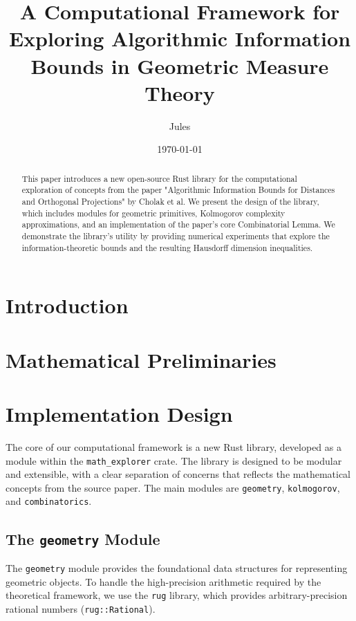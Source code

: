 \documentclass{article}
\title{A Computational Framework for Exploring Algorithmic Information Bounds in Geometric Measure Theory}
\author{Jules}
\date{\today}
\begin{document}
\maketitle

\begin{abstract}
This paper introduces a new open-source Rust library for the computational exploration of concepts from the paper "Algorithmic Information Bounds for Distances and Orthogonal Projections" by Cholak et al. We present the design of the library, which includes modules for geometric primitives, Kolmogorov complexity approximations, and an implementation of the paper's core Combinatorial Lemma. We demonstrate the library's utility by providing numerical experiments that explore the information-theoretic bounds and the resulting Hausdorff dimension inequalities.
\end{abstract}

\section{Introduction}

\section{Mathematical Preliminaries}

\section{Implementation Design}

The core of our computational framework is a new Rust library, developed as a module within the \texttt{math_explorer} crate. The library is designed to be modular and extensible, with a clear separation of concerns that reflects the mathematical concepts from the source paper. The main modules are \texttt{geometry}, \texttt{kolmogorov}, and \texttt{combinatorics}.

\subsection{The \texttt{geometry} Module}

The \texttt{geometry} module provides the foundational data structures for representing geometric objects. To handle the high-precision arithmetic required by the theoretical framework, we use the \texttt{rug} library, which provides arbitrary-precision rational numbers (\texttt{rug::Rational}).
\end{document}
